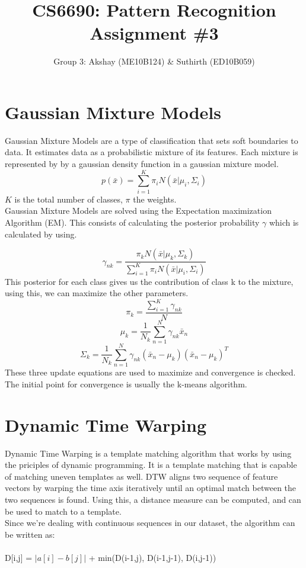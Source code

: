 \documentclass[11pt,a4paper]{article}
\begin{document}
\title{CS6690: Pattern Recognition Assignment \#3}
\author{Group 3: Akshay (ME10B124) \& Suthirth (ED10B059)}
\maketitle

\newpage

\section{Gaussian Mixture Models}
Gaussian Mixture Models are a type of classification that sets soft boundaries to data. It estimates data as a probabilistic mixture of its features. Each mixture is represented by by a gaussian density function in a gaussian mixture model.
$$
p(\bar{x}) = \sum\limits_{i=1}^K \pi_i N(\bar{x}|\mu_i, \Sigma_i)
$$
$K$ is the total number of classes, $\pi$ the weights. \\

Gaussian Mixture Models are solved using the Expectation maximization Algorithm (EM). This consists of calculating the posterior probability $\gamma$ which is calculated by using.

$$
\gamma_{nk} = \frac{\pi_k N(\bar{x}|\mu_k, \Sigma_k)}{\sum\limits_{i=1}^K \pi_i N(\bar{x}|\mu_i, \Sigma_i)}
$$
This posterior for each class gives us the contribution of class k to the mixture, using this, we can maximize the other parameters.
$$
\pi_k = \frac{\sum\limits_{i=1}^K \gamma_{nk}}{N}
$$ 
$$
\mu_k = \frac{1}{N_k} \sum\limits_{n=1}^N \gamma_{nk}\bar{x}_n
$$
$$
\Sigma_k = \frac{1}{N_k} \sum \limits_{n=1}^N \gamma_{nk}(\bar{x}_n - \mu_k)(\bar{x}_n - \mu_k)^T
$$
These three update equations are used to maximize and convergence is checked. The initial point for convergence is usually the k-means algorithm.
\newpage
\section{Dynamic Time Warping}
Dynamic Time Warping is a template matching algorithm that works by using the priciples of dynamic programming. It is a template matching that is capable of matching uneven templates as well. DTW aligns two sequence of feature vectors by warping the time axis iteratively until an optimal match between the two sequences is found. Using this, a distance measure can be computed, and can be used to match to a template.
\newline \\
Since we're dealing with continuous sequences in our dataset, the algorithm can be written as: \\ \\
D[i,j] = $|a[i] - b[j]|$ + min(D(i-1,j), D(i-1,j-1), D(i,j-1))
\end{document}
